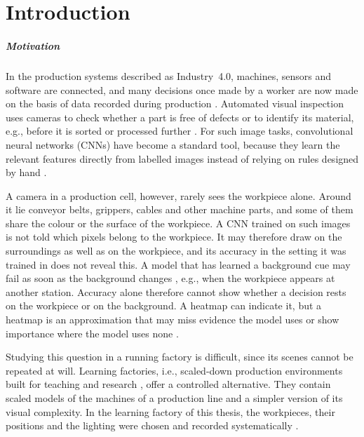 \chapter{Introduction}
\label{sec:introduction}

\paragraph{Motivation}
In the production systems described as Industry~4.0, machines, sensors and software are
connected, and many decisions once made by a worker are now made on the basis of data
recorded during production \citep{lasi2014industry}. Automated visual inspection uses
cameras to check whether a part is free of defects or to identify its material,
e.g., before it is sorted or processed further \citep{czimmermann2020visual, penumuru2020material}. For such image
tasks, convolutional neural networks (CNNs) have become a standard tool, because they
learn the relevant features directly from labelled images instead of relying on rules
designed by hand \citep{lecun2015deep}.

A camera in a production cell, however, rarely sees the workpiece alone. Around it lie
conveyor belts, grippers, cables and other machine parts, and some of them share the
colour or the surface of the workpiece. A CNN trained on such images is not told which
pixels belong to the workpiece. It may therefore draw on the surroundings as well as on
the workpiece, and its accuracy in the setting it was trained in does not reveal this. A model that has learned a background cue may fail
as soon as the background changes \citep{xiao2021noise}, e.g., when the workpiece appears
at another station. Accuracy alone therefore cannot show whether a decision rests on the
workpiece or on the background. A heatmap can indicate it, but a heatmap is an
approximation that may miss evidence the model uses or show importance where the model
uses none \citep{adebayo2018sanity}.

Studying this question in a running factory is difficult, since its scenes cannot be
repeated at will. Learning factories, i.e., scaled-down production environments built
for teaching and research \citep{kemeny2016complementary}, offer a controlled
alternative. They contain scaled models of the machines of a production line and a simpler version
of its visual complexity. In the learning factory of this thesis, the workpieces, their
positions and the lighting were chosen and recorded
systematically \citep{schneidereitYOLOv8}.

